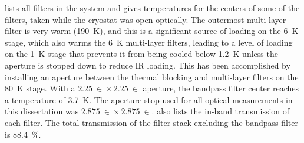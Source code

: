  lists all filters in the system and gives temperatures for the centers of some of the filters, taken while the cryostat was open optically.
The outermost multi-layer filter is very warm (\SI{190}{\K}), and this is a significant source of loading on the \SI{6}{\K} stage, which also warms the \SI{6}{\K} multi-layer filters, leading to a level of loading on the \SI{1}{\K} stage that prevents it from being cooled below \SI{1.2}{\K} unless the aperture is stopped down to reduce IR loading.
This has been accomplished by installing an aperture between the thermal blocking and multi-layer filters on the \SI{80}{\K} stage.
With a $\SI{2.25}{\in} \times \SI{2.25}{\in}$ aperture, the bandpass filter center reaches a temperature of \SI{3.7}{\K}.
The aperture stop used for all optical measurements in this dissertation was $\SI{2.875}{\in} \times \SI{2.875}{\in}$.
 also lists the in-band transmission of each filter.
The total transmission of the filter stack excluding the bandpass filter is \SI{88.4}{\percent}.

